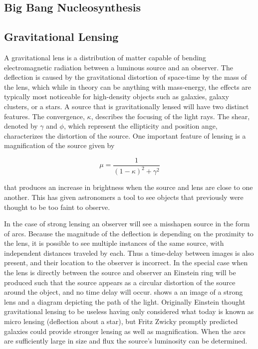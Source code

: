 \subsection{Big Bang Nucleosynthesis}



\subsection{Gravitational Lensing}
A gravitational lens is a distribution of matter capable of bending electromagnetic radiation between a luminous source and
an observer.  The deflection is caused by the gravitational distortion of space-time by the mass of the lens, which
while in theory can be anything with mass-energy, the effects are typically most noticeable for high-density objects
such as galaxies, galaxy clusters, or a stars.  A source that is gravitationally lensed will have two distinct
features. The convergence, $\kappa$, describes the focusing of the light rays.  The shear, denoted by $\gamma$ and $\phi$, which
represent the ellipticity and position ange, characterizes the distortion of the source.  One important feature of lensing
is a magnification of the source given by

\begin{equation}
\mu = \frac{1}{(1-\kappa)^{2} + \gamma^{2}}
\end{equation}

\noindent that produces an increase in brightness when the source and lens are close to one another.  This has given astronomers
a tool to see objects that previously were thought to be too faint to observe.

In the case of strong lensing an observer will see a misshapen source in the form of arcs.  Because the magnitude of the
deflection is depending on the proximity to the lens, it is possible to see multiple instances of the same source, with
independent distances traveled by each.  Thus a time-delay between images is also present, and their location to the observer
is incorrect.  In the special case
when the lens is directly between the source and observer an Einstein ring will be produced such that the source
appears as a circular distortion of the source around the object, and no time delay will occur.  
shows a an image of a strong lens and a diagram depicting the path of the light.  Originally Einstein
thought gravitational lensing to be useless having only considered what today is known as micro lensing (deflection
about a star), but Fritz Zwicky promptly predicted galaxies could provide stronger lensing as well as
magnification.  When the arcs are sufficiently large in size and flux the source's luminosity can be determined.

